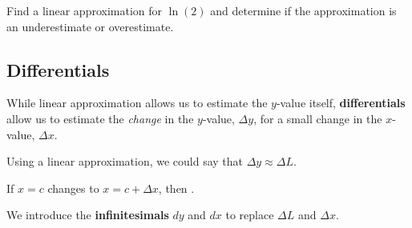 \documentclass[12pt]{article}
\begin{document}
\vspace{5mm}



\vspace{3mm}

\Example Find a linear approximation for $\ln(2)$ and determine if the approximation is an underestimate or overestimate.

\newpage

\subsection*{Differentials}

While linear approximation allows us to estimate the $y$-value itself, \textbf{differentials} allow us to estimate the \textit{change} in the $y$-value, $\Delta y$, for a small change in the $x$-value, $\Delta x$. 

\vspace{60mm}

Using a linear approximation, we could say that $\Delta y\approx \Delta L$.

\vspace{60mm}

If $x=c$ changes to $x=c+\Delta x$, then \underline{\hspace{35mm}}.

\vspace{5mm}

We introduce the \textbf{infinitesimals} $dy$ and $dx$ to replace $\Delta L$ and $\Delta x$.

\vspace{5mm}


\vspace{5mm}

\end{document}
